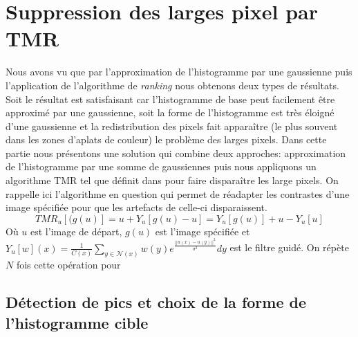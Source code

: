 \documentclass{article}
\begin{document}
\section{Suppression des larges pixel par TMR}
Nous avons vu que par l'approximation de l'histogramme par une gaussienne puis l'application de l'algorithme de \textit{ranking} nous obtenons deux types de résultats. Soit le résultat est satisfaisant car l'histogramme de base peut facilement être approximé par une gaussienne, soit la forme de l’histogramme est très éloigné d'une gaussienne et la redistribution des pixels fait apparaître (le plus souvent dans les zones d’aplats de couleur)  le problème des larges pixels.  Dans cette partie nous présentons une solution qui combine deux approches: approximation de l'histogramme par une somme de gaussiennes puis nous appliquons un algorithme TMR tel que définit dans \cite{rabin:hal-00505966} pour faire disparaître les large pixels. On rappelle ici l'algorithme en question qui permet de réadapter les contrastes d'une image spécifiée pour que les artefacts de celle-ci disparaissent.
\begin{equation}
TMR_u[(g(u)] = u+Y_u[g(u)-u] = Y_u[g(u)] + u-Y_u[u]
\end{equation}
Où $u$ est l'image de départ, $g(u)$ est l'image spécifiée et $Y_u[w](x) = \frac{1}{C(x)} \sum_{y \in \mathcal{N}(x)}w(y)e^{\frac{||u(x)-u(y)||^2}{\sigma^2}}dy$ est le filtre guidé. On répète $N$ fois cette opération pour

\subsection{Détection de pics et choix de la forme de l'histogramme cible}
\end{document}
